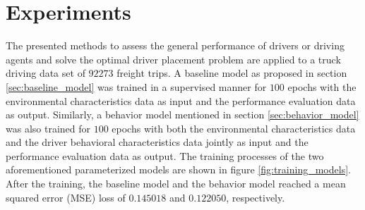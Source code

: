 \documentclass{article}
\begin{document}
\section{Experiments}\label{sec:experiments}

The presented methods to assess the general performance of drivers or driving agents and solve the optimal driver placement problem are applied to a truck driving data set of $ 92273 $ freight trips. A baseline model as proposed in section \ref{sec:baseline_model} was trained in a supervised manner for $ 100 $ epochs with the environmental characteristics data as input and the performance evaluation data as output. Similarly, a behavior model mentioned in section \ref{sec:behavior_model} was also trained for $ 100 $ epochs with both the environmental characteristics data and the driver behavioral characteristics data jointly as input and the performance evaluation data as output. The training processes of the two aforementioned parameterized models are shown in figure \ref{fig:training_models}. After the training, the baseline model and the behavior model reached a mean squared error (MSE) loss of $ 0.145018 $ and $ 0.122050 $, respectively.
\end{document}
